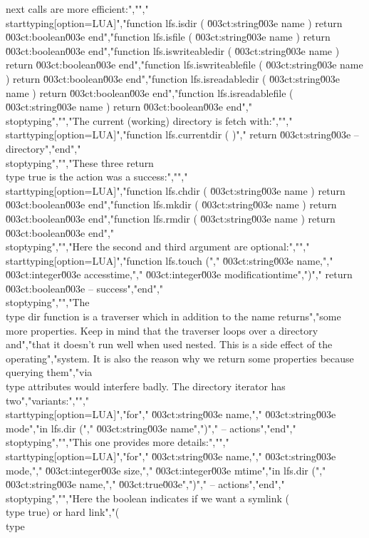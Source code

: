 next calls are more efficient:","","\\starttyping[option=LUA]","function lfs.isdir           ( \u003ct:string\u003e name ) return \u003ct:boolean\u003e end","function lfs.isfile          ( \u003ct:string\u003e name ) return \u003ct:boolean\u003e end","function lfs.iswriteabledir  ( \u003ct:string\u003e name ) return \u003ct:boolean\u003e end","function lfs.iswriteablefile ( \u003ct:string\u003e name ) return \u003ct:boolean\u003e end","function lfs.isreadabledir   ( \u003ct:string\u003e name ) return \u003ct:boolean\u003e end","function lfs.isreadablefile  ( \u003ct:string\u003e name ) return \u003ct:boolean\u003e end","\\stoptyping","","The current (working) directory is fetch with:","","\\starttyping[option=LUA]","function lfs.currentdir ( )","    return \u003ct:string\u003e -- directory","end","\\stoptyping","","These three return \\type {true} is the action was a success:","","\\starttyping[option=LUA]","function lfs.chdir ( \u003ct:string\u003e name ) return \u003ct:boolean\u003e end","function lfs.mkdir ( \u003ct:string\u003e name ) return \u003ct:boolean\u003e end","function lfs.rmdir ( \u003ct:string\u003e name ) return \u003ct:boolean\u003e end","\\stoptyping","","Here the second and third argument are optional:","","\\starttyping[option=LUA]","function lfs.touch (","    \u003ct:string\u003e  name,","    \u003ct:integer\u003e accesstime,","    \u003ct:integer\u003e modificationtime",")","    return \u003ct:boolean\u003e -- success","end","\\stoptyping","","The \\type {dir} function is a traverser which in addition to the name returns","some more properties. Keep in mind that the traverser loops over a directory and","that it doesn't run well when used nested. This is a side effect of the operating","system. It is also the reason why we return some properties because querying them","via \\type {attributes} would interfere badly. The directory iterator has two","variants:","","\\starttyping[option=LUA]","for","    \u003ct:string\u003e name,","    \u003ct:string\u003e mode","in lfs.dir (","    \u003ct:string\u003e name",")","    -- actions","end","\\stoptyping","","This one provides more details:","","\\starttyping[option=LUA]","for","    \u003ct:string\u003e  name,","    \u003ct:string\u003e  mode,","    \u003ct:integer\u003e size,","    \u003ct:integer\u003e mtime","in lfs.dir (","    \u003ct:string\u003e  name,","    \u003ct:true\u003e",")","    -- actions","end","\\stoptyping","","Here the boolean indicates if we want a symlink (\\type {true}) or hard link","(\\type 